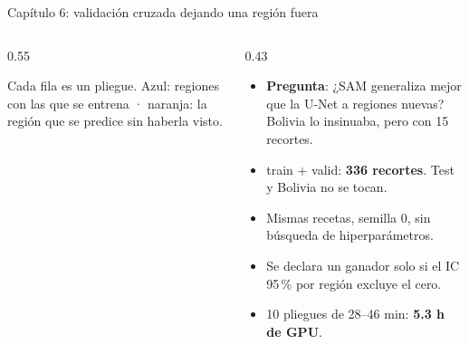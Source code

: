 \documentclass[10pt,aspectratio=1610]{beamer}
\begin{document}
\begin{frame}{Capítulo 6: validación cruzada dejando una región fuera}
  \begin{columns}[c]
    \begin{column}{0.55\textwidth}
      \centering

      {\scriptsize Cada fila es un pliegue. Azul: regiones con las que se entrena · naranja: la región que se predice sin haberla visto.}
    \end{column}
    \begin{column}{0.43\textwidth}
      \small
      \begin{itemize}
        \item \textbf{Pregunta}: ¿SAM generaliza mejor que la U-Net a regiones nuevas? Bolivia lo insinuaba, pero con 15 recortes.
        \item train + valid: \textbf{336 recortes}. Test y Bolivia no se tocan.
        \item Mismas recetas, semilla 0, sin búsqueda de hiperparámetros.
        \item Se declara un ganador solo si el IC 95\,\% por región excluye el cero.
        \item 10 pliegues de 28--46 min: \textbf{5.3 h de GPU}.
      \end{itemize}
    \end{column}
  \end{columns}
\end{frame}
\end{document}
